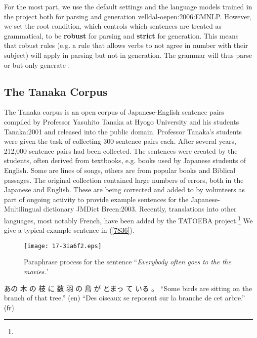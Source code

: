 \documentclass[english]{jnlp_1.4}
\newcommand{\url}[1]{}
\newcommand{\citep}{}
\newcommand{\eng}[1]{}
\newcommand{\logonX}{}
\begin{document}
For the most part, we use the default settings and the language models
    trained in the \logonX project both for parsing and generation
\citep{velldal-oepen:2006:EMNLP}. However, we set the root condition,
which controls which sentences are treated as grammatical, to be
\textbf{robust} for parsing and \textbf{strict} for generation. This
means that robust rules (e.g. a rule that allows verbs to not agree in
number with their subject) will apply in parsing but not in
generation. The grammar will thus parse \eng{The dog bark} or \eng{The
dog barks} but only generate \eng{The dog barks}.




\subsection{The Tanaka Corpus}

The Tanaka corpus is an open corpus of Japanese-English sentence pairs
compiled by Professor Yasuhito Tanaka at Hyogo University and his
students \citep{Tanaka:2001} and released into the public domain.
Professor Tanaka's students were given the task of collecting 300
sentence pairs each. After several years, 212,000 sentence pairs had
been collected. The sentences were created by the students, often
derived from textbooks, e.g. books used by Japanese students of
English. Some are lines of songs, others are from popular books and
Biblical passages. The original collection contained large numbers of
errors, both in the Japanese and English. These are being corrected
and added to by volunteers as part of ongoing activity to provide
example sentences for the Japanese-Multilingual dictionary JMDict
\citep{Breen:2003}. Recently, translations into other languages, most
notably French, have been added by the TATOEBA
project.\footnote{\url{http://tatoeba.fr}} We give a typical example
sentence in (\ref{7836}).

\begin{figure}[t]
\begin{center}
\texttt{[image: 17-3ia6f2.eps]}
\end{center}
\caption{Paraphrase process for the sentence ``\textit{Everybody often goes to the the movies.}'}
\label{fig:para}
\end{figure}

\begin{exe} \small
\ex \label{7836}
あの 木 の 枝 に 数 羽 の 鳥 が とまっ て いる 。
\trans ``Some birds are sitting on the branch of that tree.'' (en)
\trans ``Des oiseaux se reposent sur la branche de cet arbre.'' (fr)
\end{exe}
\end{document}
